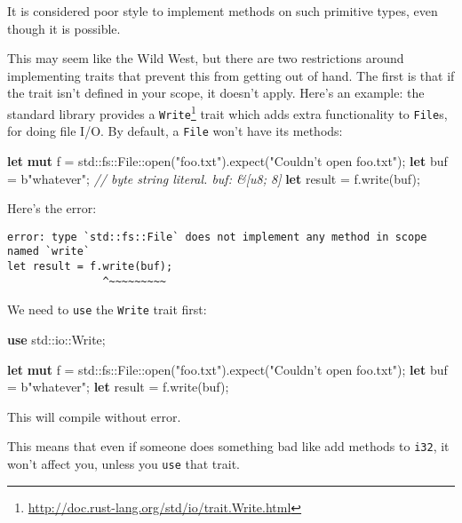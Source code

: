 \documentclass[a4paper,]{book}
\newenvironment{Shaded}{\begin{snugshade}}{\end{snugshade}}
\newcommand{\KeywordTok}[1]{\textcolor[rgb]{0.13,0.29,0.53}{\textbf{{#1}}}}
\newcommand{\StringTok}[1]{\textcolor[rgb]{0.31,0.60,0.02}{{#1}}}
\newcommand{\CommentTok}[1]{\textcolor[rgb]{0.56,0.35,0.01}{\textit{{#1}}}}
\newcommand{\NormalTok}[1]{{#1}}
\renewcommand{\href}[2]{#2\footnote{\url{#1}}}
\begin{document}
It is considered poor style to implement methods on such primitive
types, even though it is possible.

This may seem like the Wild West, but there are two restrictions around
implementing traits that prevent this from getting out of hand. The
first is that if the trait isn't defined in your scope, it doesn't
apply. Here's an example: the standard library provides a
\href{http://doc.rust-lang.org/std/io/trait.Write.html}{\texttt{Write}}
trait which adds extra functionality to \texttt{File}s, for doing file
I/O. By default, a \texttt{File} won't have its methods:

\begin{Shaded}
\begin{Highlighting}[]
\KeywordTok{let} \KeywordTok{mut} \NormalTok{f = std::fs::File::open(}\StringTok{"foo.txt"}\NormalTok{).expect(}\StringTok{"Couldn’t open foo.txt"}\NormalTok{);}
\KeywordTok{let} \NormalTok{buf = b}\StringTok{"whatever"}\NormalTok{; }\CommentTok{// byte string literal. buf: &[u8; 8]}
\KeywordTok{let} \NormalTok{result = f.write(buf);}
\end{Highlighting}
\end{Shaded}

Here's the error:

\begin{verbatim}
error: type `std::fs::File` does not implement any method in scope named `write`
let result = f.write(buf);
               ^~~~~~~~~~
\end{verbatim}

We need to \texttt{use} the \texttt{Write} trait first:

\begin{Shaded}
\begin{Highlighting}[]
\KeywordTok{use} \NormalTok{std::io::Write;}

\KeywordTok{let} \KeywordTok{mut} \NormalTok{f = std::fs::File::open(}\StringTok{"foo.txt"}\NormalTok{).expect(}\StringTok{"Couldn’t open foo.txt"}\NormalTok{);}
\KeywordTok{let} \NormalTok{buf = b}\StringTok{"whatever"}\NormalTok{;}
\KeywordTok{let} \NormalTok{result = f.write(buf);}
\end{Highlighting}
\end{Shaded}

This will compile without error.

This means that even if someone does something bad like add methods to
\texttt{i32}, it won't affect you, unless you \texttt{use} that trait.
\end{document}
